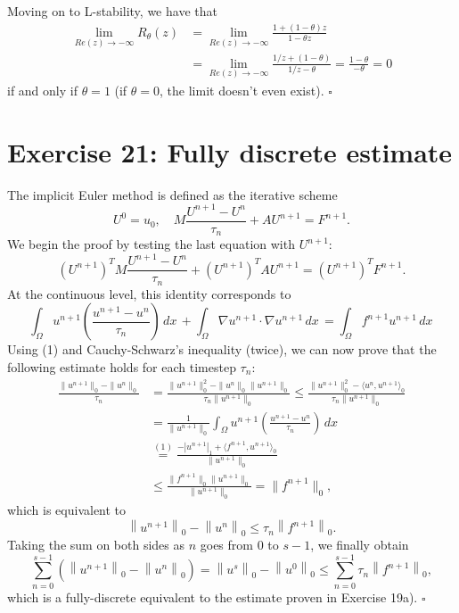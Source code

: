 \documentclass[a4paper]{article}
\newcommand{\dx}{\, dx \,}
\newcommand{\seminorm}[1]{\left\lvert #1 \right\rvert}
\newcommand{\norm}[1]{\left\lVert #1 \right\rVert}
\begin{document}
Moving on to L-stability, we have that
\begin{align*}
\lim_{Re(z)\to-\infty} R_\theta(z)
&	= \lim_{Re(z)\to-\infty} \frac{1+(1-\theta)z}{1-\theta z} \\
&	= \lim_{Re(z)\to-\infty} \frac{1/z+(1-\theta)}{1/z-\theta}
	= \frac{1-\theta}{-\theta}
	= 0
\end{align*}
if and only if $\theta = 1$ (if $\theta = 0$, the limit doesn't even exist). $\square$

\section*{Exercise 21: Fully discrete estimate}
The implicit Euler method is defined as the iterative scheme
\[
U^0 = u_0, \quad
M \frac{U^{n+1}-U^n}{\tau_n} + AU^{n+1} = F^{n+1}.
\]
We begin the proof by testing the last equation with $U^{n+1}$:
\[
(U^{n+1})^T M \frac{U^{n+1}-U^n}{\tau_n} + (U^{n+1})^TAU^{n+1} = (U^{n+1})^TF^{n+1}.
\]
At the continuous level, this identity corresponds to
\begin{equation}
\int_\Omega u^{n+1} \left( \frac{u^{n+1}-u^n}{\tau_n} \right) \dx
+ \int_\Omega \nabla u^{n+1} \cdot \nabla u^{n+1} \dx
= \int_\Omega f^{n+1} u^{n+1} \dx
\end{equation}
Using (1) and Cauchy-Schwarz's inequality (twice),
we can now prove that the following estimate holds for each timestep $\tau_n$:
\addtolength{\jot}{6pt}
\begin{align*}
\frac{\|u^{n+1}\|_0-\|u^{n}\|_0}{\tau_n}
&	=\frac{\|u^{n+1}\|^2_0-\|u^n\|_0\|u^{n+1}\|_0}{\tau_n\|u^{n+1}\|_0}
	\leq\frac{\|u^{n+1}\|^2_0-\langle u^n,u^{n+1}\rangle_0}{\tau_n\|u^{n+1}\|_0} \\
&	=\frac{1}{\|u^{n+1}\|_0}\int_\Omega u^{n+1}\left(\frac{u^{n+1}-u^n}{\tau_n}\right)\dx \\
&	\stackrel{(1)}{=}\frac{-\seminorm{u^{n+1}}_1
		+\langle f^{n+1},u^{n+1}\rangle_0}{\|u^{n+1}\|_0} \\
&	\leq\frac{\|f^{n+1}\|_0\|u^{n+1}\|_0}{\|u^{n+1}\|_0}
	=\|f^{n+1}\|_0,
\end{align*}
which is equivalent to
\[
\norm{u^{n+1}}_0 - \norm{u^n}_0
\leq \tau_n \norm{f^{n+1}}_0.
\]
Taking the sum on both sides as $n$ goes from $0$ to $s-1$, we finally obtain
\[
\sum_{n=0}^{s-1} \left( \norm{u^{n+1}}_0 - \norm{u^n}_0 \right)
= \norm{u^s}_0 - \norm{u^0}_0
\leq \sum_{n=0}^{s-1} \tau_n \norm{f^{n+1}}_0,
\]
which is a fully-discrete equivalent to the estimate proven in Exercise 19a). $\square$
\end{document}
